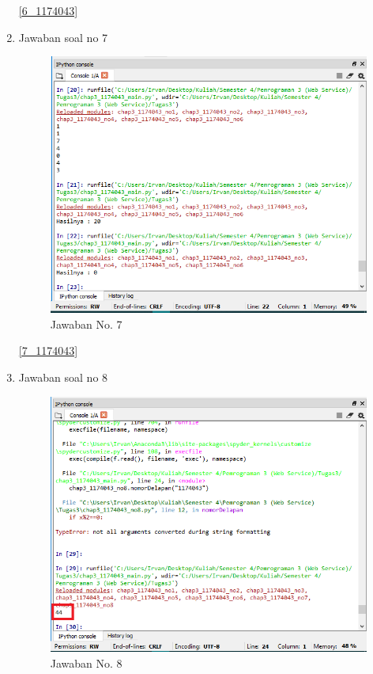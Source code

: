 \begin{enumerate}
				\ref{6_1174043}
				
			\item Jawaban soal no 7
				
				
				\begin{figure} [ht]
					\centerline{\includegraphics[width=1\textwidth]{figures/chapter3/7_1174043.png}}
					\caption{Jawaban No. 7}
					\label{7}
				\end{figure}

				\ref{7_1174043}
				
			\item Jawaban soal no 8
				
				
				\begin{figure} [ht]
					\centerline{\includegraphics[width=1\textwidth]{figures/chapter3/8_1174043.png}}
					\caption{Jawaban No. 8}
					\label{8}
				\end{figure}


\end{enumerate}

